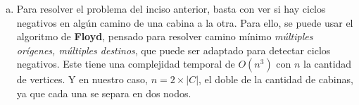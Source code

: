 \documentclass[12pt, a4paper]{report}
\theoremstyle{definition} %
\begin{document}
\begin{enumerate}[a)]
\item Para resolver el problema del inciso anterior, basta con ver si hay ciclos negativos en algún camino de una cabina a la otra. Para ello, se puede usar el algoritmo de \textbf{Floyd}, pensado para resolver camino mínimo \textit{múltiples orígenes, múltiples destinos}, que puede ser adaptado para detectar ciclos negativos. Este tiene una complejidad temporal de $O(n^3)$ con $n$ la cantidad de vertices. Y en nuestro caso, $n = 2 \times|C|$, el doble de la cantidad de cabinas, ya que cada una se separa en dos nodos.

\end{enumerate}
\end{document}
